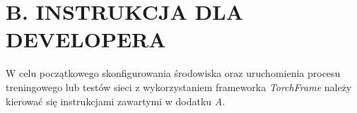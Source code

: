 \section*{B. INSTRUKCJA DLA DEVELOPERA}

  W celu początkowego skonfigurowania środowiska oraz uruchomienia procesu
  treningowego lub testów sieci z wykorzystaniem frameworka \textit{TorchFrame}
  należy kierować się instrukcjami zawartymi w dodatku \textit{A}.

  
